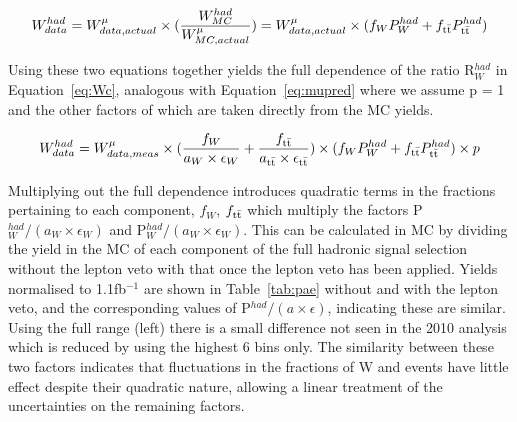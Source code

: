 \begin{equation}
W^{had}_{data} = W^{\mu}_{data, actual } \times (\frac{W^{had}_{MC}}{W^{\mu}_{MC, actual}}) = W^{\mu}_{data, actual } \times (f_{W} P^{had}_{W} + f_{\textrm{t}\bar{\textrm{t}}} P^{had}_{\textrm{t}\bar{\textrm{t}}})
\label{eq:Wb}
\end{equation}

Using these two equations together yields the full dependence of the ratio R$^{had}_{W}$ in Equation~\ref{eq:Wc}, analogous with Equation~\ref{eq:mupred} where we assume p = 1 and the other factors of which are taken directly from the MC yields.

\begin{equation}
W^{had}_{data} = W^{\mu}_{data, meas} \times (\frac{f_{W}}{a_{W} \times \epsilon_{W}} + \frac{f_{\textrm{t}\bar{\textrm{t}}}}{a_{\textrm{t}\bar{\textrm{t}}} \times \epsilon_{\textrm{t}\bar{\textrm{t}}}}) \times (f_{W} P^{had}_{W} + f_{\textrm{t}\bar{\textrm{t}}} P^{had}_{\textrm{t}\bar{\textrm{t}}}) \times p
\label{eq:Wc}
\end{equation}

 Multiplying out the full dependence introduces quadratic terms in the fractions pertaining to each component, $f_{W}$, $f_{\textrm{t}\bar{\textrm{t}}}$ which multiply the factors P$^{had}_{W}/(a_{W} \times \epsilon_{W})$ and P$^{had}_{W}/(a_{W} \times \epsilon_{W})$. This can be calculated in MC by dividing the yield in the MC of each component of the full hadronic signal selection without the lepton veto with that once the lepton veto has been applied. Yields normalised to 1.1fb$^{-1}$ are shown in Table~\ref{tab:pae} without and with the lepton veto, and the corresponding values of P$^{had}/(a \times \epsilon)$, indicating these are similar. Using the full \HT range (left) there is a small difference not seen in the 2010 analysis which is reduced by using the highest 6 bins only. The similarity between these two factors indicates that fluctuations in the fractions of W and \tto events have little effect despite their quadratic nature, allowing a linear treatment of the uncertainties on the remaining factors. 
 
